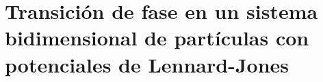 


\chapter{Transición de fase en un sistema bidimensional de partículas con potenciales de Lennard-Jones}


